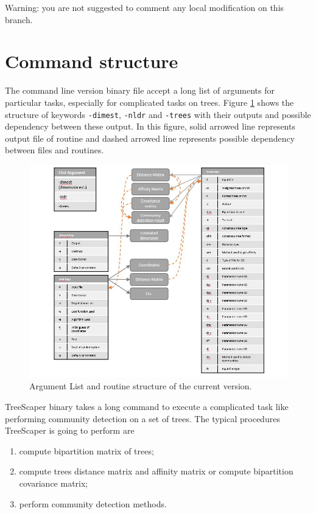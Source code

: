 \documentclass[11pt,a4paper]{article}
\theoremstyle{definition}
\theoremstyle{definition}
\numberwithin{equation}{section}
\begin{document}
	Warning: you are not suggested to comment any local modification on this 
	branch. 
	

	
	\section{Command structure}
	
	The command line version binary file accept a long list of arguments for particular tasks, especially for complicated tasks on trees. Figure \ref{fig:argumentcurrent} shows the structure of keywords \texttt{-dimest}, \texttt{-nldr} and \texttt{-trees} with their outputs and possible dependency between these output. In this figure, solid arrowed line represents output file of routine and dashed arrowed line represents possible dependency between files and routines.
	
	\begin{figure}[!h]
		\includegraphics[width=\textwidth]{ArgumentList1.jpg}
		\caption{Argument List and routine structure of the current version.}
		\label{fig:argumentcurrent}
	\end{figure}
	
	TreeScaper binary takes a long command to execute a complicated task like performing community detection on a set of trees. The typical procedures TreeScaper is going to perform are
	\begin{enumerate}
		\item compute bipartition matrix of trees;
		\item compute trees distance matrix and affinity matrix or compute bipartition covariance matrix;
		\item perform community detection methods.
	\end{enumerate}
	
\end{document}
